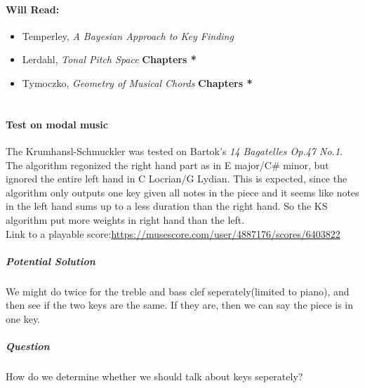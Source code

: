 \documentclass[12pt]{report}
\begin{document}
\paragraph*{Will Read:}
\begin{itemize}
    \item Temperley, \emph{A Bayesian Approach to Key Finding}
    \item Lerdahl, \emph{Tonal Pitch Space} \textbf{Chapters *}
    \item Tymoczko, \emph{Geometry of Musical Chords} \textbf{Chapters *} 
\end{itemize}

\section*{}
\paragraph*{Test on modal music}
The Krumhansl-Schmuckler was tested on Bartok's \emph{14 Bagatelles Op.47 No.1}. The
algorithm regonized the right hand part as in E major/C\# minor, but ignored
the entire left hand in C Locrian/G Lydian. This is expected, since
the algorithm only outputs one key given all notes in the piece and 
it seems like notes in the left hand sums up to a less duration than
the right hand. So the KS algorithm put more weights in right hand than the
left. 
\\Link to a playable score:\url{https://musescore.com/user/4887176/scores/6403822}
\subparagraph*{Potential Solution}
We might do twice for the treble and bass clef seperately(limited to piano),
and then see if the two keys are the same. If they are, then we can say the
piece is in one key. 
\subparagraph*{Question}
How do we determine whether we should talk about keys seperately?
\end{document}
